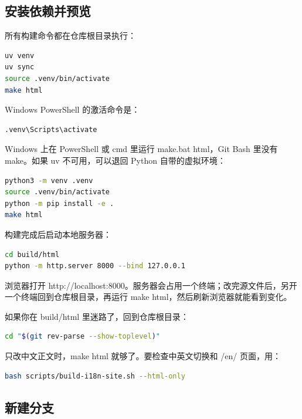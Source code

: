 \documentclass[UTF8,fontset=none,a4paper,11pt]{ctexart}
\newcommand{\code}[1]{{\CJKsetecglue{}\ttfamily #1}}
\begin{document}
\subsection{安装依赖并预览}\label{sec:install-and-preview}

所有构建命令都在仓库根目录执行：

\begin{lstlisting}[language=bash]
uv venv
uv sync
source .venv/bin/activate
make html
\end{lstlisting}

Windows PowerShell 的激活命令是：

\begin{lstlisting}
.venv\Scripts\activate
\end{lstlisting}

Windows 上在 PowerShell 或 cmd 里运行 \code{make.bat html}，Git Bash 里没有 \code{make}。如果 \code{uv} 不可用，可以退回 Python 自带的虚拟环境：

\begin{lstlisting}[language=bash]
python3 -m venv .venv
source .venv/bin/activate
python -m pip install -e .
make html
\end{lstlisting}

构建完成后启动本地服务器：

\begin{lstlisting}[language=bash]
cd build/html
python -m http.server 8000 --bind 127.0.0.1
\end{lstlisting}

浏览器打开 \code{http://localhost:8000}。服务器会占用一个终端；改完源文件后，另开一个终端回到仓库根目录，再运行 \code{make html}，然后刷新浏览器就能看到变化。

如果你在 \code{build/html} 里迷路了，回到仓库根目录：

\begin{lstlisting}[language=bash]
cd "$(git rev-parse --show-toplevel)"
\end{lstlisting}

只改中文正文时，\code{make html} 就够了。要检查中英文切换和 \code{/en/} 页面，用：

\begin{lstlisting}[language=bash]
bash scripts/build-i18n-site.sh --html-only
\end{lstlisting}

\subsection{新建分支}\label{sec:new-branch}
\end{document}
